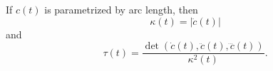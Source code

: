 If $c(t)$ is parametrized by arc length, then
$$\kappa(t) = |\ddot{c}(t)|$$
and
$$\tau(t) = \frac{\det(\dot{c}(t), \ddot{c}(t), \dddot{c}(t))}{\kappa^2(t)}.$$

